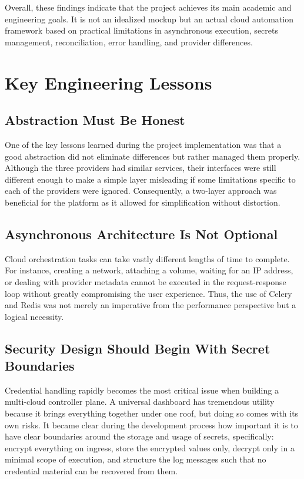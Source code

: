 Overall, these findings indicate that the project achieves its main academic and engineering goals. It is not an idealized mockup but an actual cloud automation framework based on practical limitations in asynchronous execution, secrets management, reconciliation, error handling, and provider differences.

\section{Key Engineering Lessons}
\subsection{Abstraction Must Be Honest}
One of the key lessons learned during the project implementation was that a good abstraction did not eliminate differences but rather managed them properly. Although the three providers had similar services, their interfaces were still different enough to make a simple layer misleading if some limitations specific to each of the providers were ignored. Consequently, a two-layer approach was beneficial for the platform as it allowed for simplification without distortion.

\subsection{Asynchronous Architecture Is Not Optional}
Cloud orchestration tasks can take vastly different lengths of time to complete. For instance, creating a network, attaching a volume, waiting for an IP address, or dealing with provider metadata cannot be executed in the request-response loop without greatly compromising the user experience. Thus, the use of Celery and Redis was not merely an imperative from the performance perspective but a logical necessity.

\subsection{Security Design Should Begin With Secret Boundaries}
Credential handling rapidly becomes the most critical issue when building a multi-cloud controller plane. A universal dashboard has tremendous utility because it brings everything together under one roof, but doing so comes with its own risks. It became clear during the development process how important it is to have clear boundaries around the storage and usage of secrets, specifically: encrypt everything on ingress, store the encrypted values only, decrypt only in a minimal scope of execution, and structure the log messages such that no credential material can be recovered from them.

